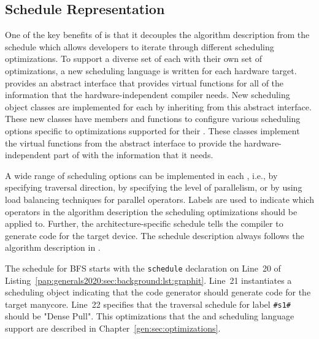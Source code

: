 \subsection{Schedule Representation}
One of the key benefits of \graphit is that it decouples the algorithm description from the schedule which allows developers to iterate through different scheduling optimizations. 
To support a diverse set of \graphvms each with their own set of optimizations, a new scheduling language is written for each hardware target. 
\GG provides an abstract interface that provides virtual functions for all of the information that the hardware-independent compiler needs.
New scheduling object classes are implemented for each \graphvm by inheriting from this abstract interface. 
These new classes have members and functions to configure various scheduling options specific to optimizations supported for their \graphvms. 
These classes implement the virtual functions from the abstract interface to provide the hardware-independent part of \GG with the information that it needs.

A wide range of scheduling options can be implemented in each \graphvm, i.e., by specifying traversal direction, by specifying the level of parallelism, or by using load balancing techniques for parallel operators.
Labels are used to indicate which operators in the algorithm description the scheduling optimizations should be applied to.
Further, the architecture-specific schedule tells the compiler to generate code for the target device.
The schedule description always follows the algorithm description in \graphit.

The schedule for BFS starts with the \lstinline[language=graphit]{schedule} declaration on Line~20 of Listing~\ref{pap:generals2020:sec:background:lst:graphit}. 
Line~21 instantiates a \hb scheduling object indicating that the code generator should generate code for the target manycore. 
Line~22 specifies that the traversal schedule for label \lstinline[language=graphit]{#s1#} should be "Dense Pull". 
This optimizations that the \hb \graphvm and scheduling language support are described in Chapter~\ref{gen:sec:optimizations}. 

